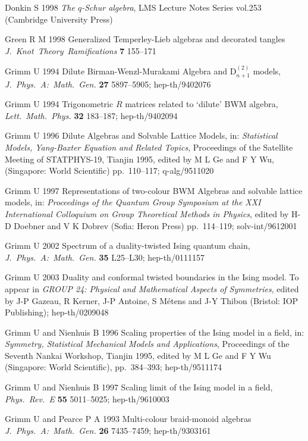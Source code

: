 \documentclass[12pt]{iopart}
\begin{document}
Donkin S 1998 {\it The $q$-Schur algebra}, LMS Lecture Notes Series
vol.253 (Cambridge University Press)

Green R M 1998
Generalized Temperley-Lieb algebras and decorated tangles
{\it J.\ Knot\ Theory\ Ramifications}\/ {\bf 7} 155--171

Grimm U 1994
Dilute Birman-Wenzl-Murakami Algebra and D$_{n+1}^{(2)}$ models,
{\it J.\ Phys.\ A:\  Math.\ Gen.}\/ {\bf 27} 5897--5905;
hep-th/9402076

Grimm U 1994
Trigonometric $R$ matrices related to `dilute' BWM algebra,
{\it Lett.\ Math.\ Phys.}\/ {\bf 32} 183--187;
hep-th/9402094

Grimm U 1996
Dilute Algebras and Solvable Lattice Models,
in: {\em  Statistical Models, Yang-Baxter Equation and Related Topics}, 
Proceedings of the Satellite Meeting of STATPHYS-19, Tianjin 1995,
edited by M L Ge and F Y Wu,
(Singapore: World Scientific) pp.~110--117;
q-alg/9511020

Grimm U 1997
Representations of two-colour BWM Algebras and solvable lattice models,
in: {\em Proceedings of the Quantum Group Symposium at the XXI 
International Colloquium on Group Theoretical Methods in Physics},
edited by H-D Doebner and V K Dobrev
(Sofia: Heron Press) pp.~114--119;
solv-int/9612001

Grimm U 2002
Spectrum of a duality-twisted Ising quantum chain,
{\it J.\ Phys.\ A:\  Math.\ Gen.}\/  {\bf 35}  L25--L30;
hep-th/0111157

Grimm U 2003
Duality and conformal twisted boundaries in the Ising model.
To appear in {\em GROUP 24: Physical and Mathematical Aspects 
of Symmetries},
edited by J-P Gazeau, R Kerner, J-P Antoine, S M\'{e}tens and
J-Y Thibon (Bristol: IOP Publishing); 
hep-th/0209048

Grimm U and Nienhuis B 1996
Scaling properties of the Ising model in a field,
in: {\em Symmetry, Statistical Mechanical Models and 
Applications}, Proceedings of the Seventh Nankai Workshop, Tianjin 1995,
edited by M L Ge and F Y Wu
(Singapore: World Scientific), pp.~384--393;
hep-th/9511174

Grimm U and Nienhuis B 1997
Scaling limit of the Ising model in a field,
{\it Phys.\ Rev.\ E}\/ {\bf 55} 5011--5025;
hep-th/9610003

Grimm U and Pearce P A 1993
Multi-colour braid-monoid algebras
{\it J.\ Phys.\ A:\  Math.\ Gen.}\/ {\bf 26} 7435--7459;
hep-th/9303161
\end{document}

